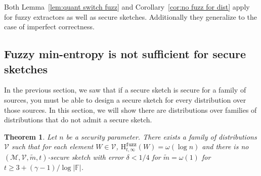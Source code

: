 \documentclass[11pt]{article}
\newcommand{\corref}[1]{\mbox{Corollary~\ref{#1}}}
\newcommand{\lemref}[1]{\mbox{Lemma~\ref{#1}}}
\newcommand{\Hfuzz}{\mathrm{H}^{\mathtt{fuzz}}_{t,\infty}}
\newtheorem{theorem}{Theorem}[section]
\begin{document}

Both \lemref{lem:quant switch fuzz} and \corref{cor:no fuzz for dist} apply for fuzzy extractors as well as secure sketches.  Additionally they generalize to the case of imperfect correctness.

\subsection{Fuzzy min-entropy is not sufficient for secure sketches}
In the previous section, we saw that if a secure sketch is secure for a family of sources, you must be able to design a secure sketch for every distribution over those sources.  In this section, we will show there are distributions over families of distributions that do not admit a secure sketch.

\begin{theorem}
\label{thm:imposs sketch}
Let $n$ be a security parameter.  There exists a family of distributions $\mathcal{V}$ such that for each element $W\in \mathcal{V}$, $\Hfuzz(W)= \omega(\log n)$ and there is no $(\mathcal{M}, \mathcal{V}, \tilde{m}, t)$-secure sketch with error $\delta < 1/4$ for $\tilde{m} =\omega(1)$ for $t\ge 3 + (\gamma-1) / \log |\mathbb{F}|$.  
\end{theorem}
\end{document}
